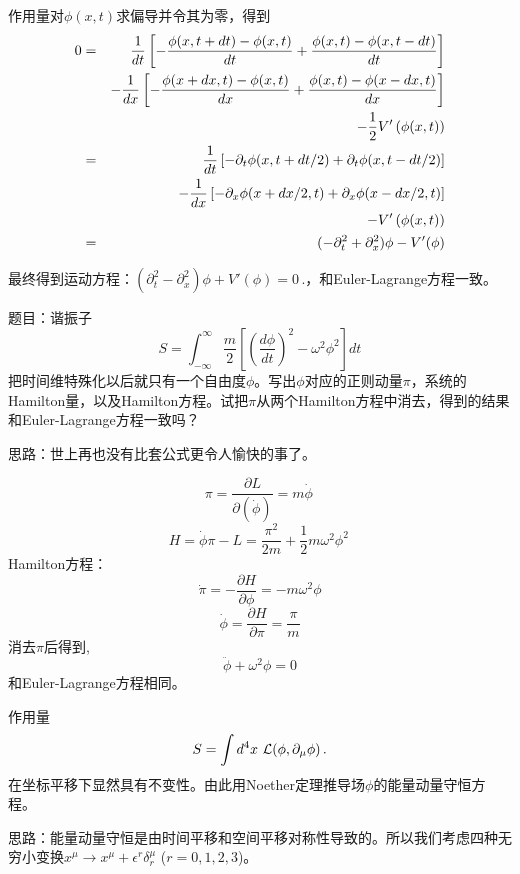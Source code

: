 \documentclass[CJK]{beamer}
\begin{document}
\begin{frame}
\bch
作用量对$\phi(x, t)$求偏导并令其为零，得到
\begin{eqnarray}
0 &=& \frac{1}{dt} \left [ -\frac{\phi(x, t+dt) - \phi(x,t)}{dt} + \frac{\phi(x, t) - \phi(x,t-dt)}{dt}\right]  \nonumber \\
  && -\frac{1}{dx}\left [- \frac{\phi(x+dx, t) - \phi(x,t)}{dx} + \frac{\phi(x, t) - \phi(x-dx,t)}{dx}\right] \nonumber \\
  && -\frac{1}{2}V'\left(\phi(x, t)\right) \nonumber \\ 
  &=& \frac{1}{dt}\left[-\partial_t\phi(x, t+dt/2) + \partial_t\phi(x, t-dt/2)\right] \nonumber \\
   &&- \frac{1}{dx}\left[-\partial_x\phi(x+dx/2, t) + \partial_x\phi(x-dx/2, t)\right] \nonumber \\
   &&-   V'\left(\phi(x, t)\right)  \nonumber \\
  &=& (- \partial_t^2 + \partial_x^2 )\phi - V'(\phi) \nonumber 
\end{eqnarray}
\ech
\end{frame}

\begin{frame}
\bch
最终得到运动方程：$(\partial_t^2 - \partial_x^2 )\phi + V'(\phi) = 0 \,.$，和Euler-Lagrange方程一致。
\ech
\end{frame}


\begin{frame}
\bch
题目：谐振子
$$ S = \int_{-\infty}^\infty \frac{m}{2}\left[(\frac{d\phi}{dt})^2 - \omega^2\phi^2\right] dt$$
把时间维特殊化以后就只有一个自由度$\phi$。写出$\phi$对应的正则动量$\pi$，系统的Hamilton量，以及Hamilton方程。试把$\pi$从两个Hamilton方程中消去，得到的结果和Euler-Lagrange方程一致吗？

\skipline
思路：世上再也没有比套公式更令人愉快的事了。
\ech
\end{frame}

\begin{frame}
\bch
$$\pi = \frac{\partial L}{\partial (\dot\phi)} = m\dot\phi \, $$
$$ H = \dot\phi \pi - L = \frac{\pi^2}{2m} +  \frac{1}{2}m\omega^2\phi^2 \, $$
Hamilton方程：
$$\dot\pi = -\frac{\partial H}{\partial\phi} = - m\omega^2\phi$$  
$$\dot\phi = \frac{\partial H}{\partial \pi} = \frac{\pi}{m} $$
消去$\pi$后得到,
$$\ddot\phi + \omega^2\phi = 0$$
和Euler-Lagrange方程相同。
\ech
\end{frame}

\begin{frame}
\bch
作用量
$$S = \int d^4x\ {\mathcal{L}}(\phi, \partial_\mu\phi)\,.$$
在坐标平移下显然具有不变性。由此用Noether定理推导场$\phi$的能量动量守恒方程。

\skipline

思路：能量动量守恒是由时间平移和空间平移对称性导致的。所以我们考虑四种无穷小变换$x^\mu \rightarrow x^\mu + \epsilon^r \delta_r^\mu$ ($r = 0, 1, 2, 3$)。
\ech
\end{frame}
\end{document}
